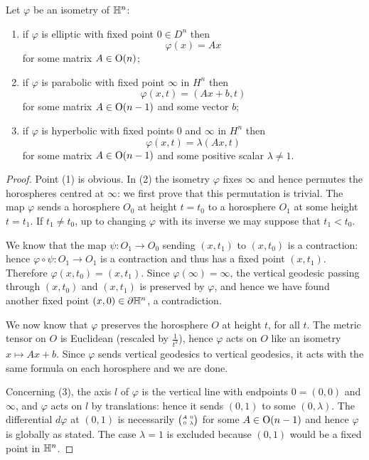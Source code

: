 \begin{prop} \label{tre:prop}
Let $\varphi$ be an isometry of $\mathbb{H}^n$:
\begin{enumerate}
\item if $\varphi$ is elliptic with fixed point $0\in D^n$ then
$$\varphi(x) = Ax$$
for some matrix $A\in {\rm O}(n)$; 
\item if $\varphi$ is parabolic with fixed point $\infty$ in $H^n$ then
$$\varphi (x,t) = (Ax+b, t)$$ 
for some matrix $A\in {\rm O}(n-1)$ and some vector $b$;
\item if $\varphi$ is hyperbolic with fixed points $0$ and $\infty$ in $H^n$ then
$$\varphi (x,t) = \lambda(Ax,t)$$
for some matrix $A\in {\rm O}(n-1)$ and some positive scalar $\lambda\neq 1$.
\end{enumerate}
\end{prop}
\begin{proof}
Point (1) is obvious. In (2) the isometry $\varphi$ fixes $\infty$ and hence permutes the horospheres centred at $\infty$: we first prove that this permutation is trivial. The map $\varphi$ sends a horosphere $O_0$ at height $t=t_0$ to a horosphere $O_1$ at some height $t=t_1$. If  $t_1\neq t_0$, up to changing $\varphi$ with its inverse we may suppose that $t_1<t_0$. 

We know that the map $\psi\colon O_1 \to O_0$ sending $(x,t_1)$ to $(x,t_0)$ is a contraction: hence $\varphi\circ\psi \colon O_1 \to O_1$ is a contraction and thus has a fixed point $(x,t_1)$. Therefore $\varphi(x,t_0) = (x,t_1)$. Since $\varphi(\infty)=\infty$, the vertical geodesic passing through $(x,t_0)$ and $(x,t_1)$ is preserved by $\varphi$, and hence we have found another fixed point $(x,0)\in\partial \mathbb{H}^n$, a contradiction.

We now know that $\varphi$ preserves the horosphere $O$ at height $t$, for all $t$.
The metric tensor on $O$ is Euclidean (rescaled by $\frac 1{t^2}$), hence $\varphi$ acts on $O$ like an isometry $x\mapsto Ax+b$.
Since $\varphi$ sends vertical geodesics to vertical geodesics, it acts with the same formula on each horosphere and we are done.

Concerning (3), the axis $l$ of $\varphi$ is the vertical line with endpoints $0=(0,0)$ and $\infty$, and $\varphi$ acts on $l$ by translations: hence it sends $(0,1)$ to some $(0,\lambda)$. The differential $d\varphi$ at $(0,1)$ is necessarily $\matr A 0 0 \lambda$ for some $A\in {\rm O}(n-1)$ and hence $\varphi$ is globally as stated. The case $\lambda = 1$ is excluded because $(0,1)$ would be a fixed point in $\mathbb{H}^n$.
\end{proof}

